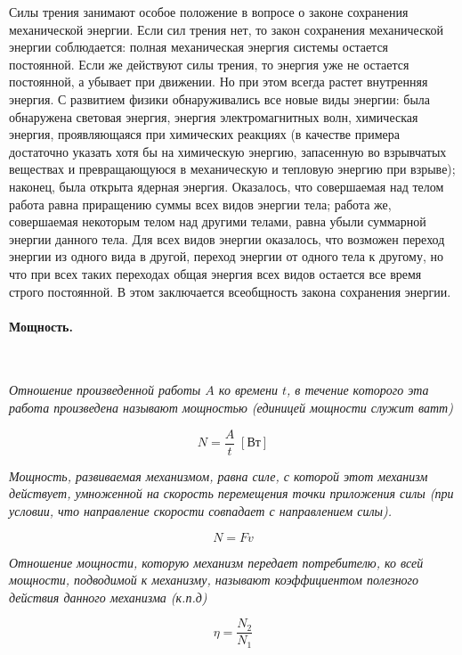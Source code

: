 \documentclass[a4paper,12pt]{article}
\begin{document}
		Силы трения занимают особое положение в вопросе о законе сохранения механической энергии. 
		Если сил трения нет, то закон сохранения механической энергии соблюдается: полная механическая 
		энергия системы остается постоянной. Если же действуют силы трения, то энергия уже не остается 
		постоянной, а убывает при движении. Но при этом всегда растет внутренняя энергия. С развитием 
		физики обнаруживались все новые виды энергии: была обнаружена световая энергия, энергия 
		электромагнитных волн, химическая энергия, проявляющаяся при химических реакциях (в качестве 
		примера достаточно указать хотя бы на химическую энергию, запасенную во взрывчатых веществах 
		и превращающуюся в механическую и тепловую энергию при взрыве); наконец, была открыта ядерная 
		энергия. Оказалось, что совершаемая над телом работа равна приращению суммы всех видов энергии 
		тела; работа же, совершаемая некоторым телом над другими телами, равна убыли суммарной энергии 
		данного тела. Для всех видов энергии оказалось, что возможен переход энергии из одного вида в 
		другой, переход энергии от одного тела к другому, но что при всех таких переходах общая энергия 
		всех видов остается все время строго постоянной. В этом заключается всеобщность закона сохранения 
		энергии.

		\paragraph{Мощность.} \

		\textit{Отношение произведенной работы $A$ ко времени $t$, в течение которого эта работа произведена
		называют мощностью (единицей мощности служит ватт)}

		\begin{equation}
			N = \frac{A}{t} \; [\text{Вт}]
		\end{equation}

		\textit{Мощность, развиваемая механизмом, равна силе, с которой этот механизм действует, умноженной
		на скорость перемещения точки приложения силы (при условии, что направление скорости совпадает с 
		направлением силы).}

		\begin{equation}
			N = Fv
		\end{equation}

		\clearpage{}
		\textit{Отношение мощности, которую механизм передает потребителю, ко всей мощности, подводимой 
		к механизму, называют коэффициентом полезного действия данного механизма (к.п.д)}

		\begin{equation}
			\eta = \frac{N_2}{N_1}
		\end{equation}
\end{document}
